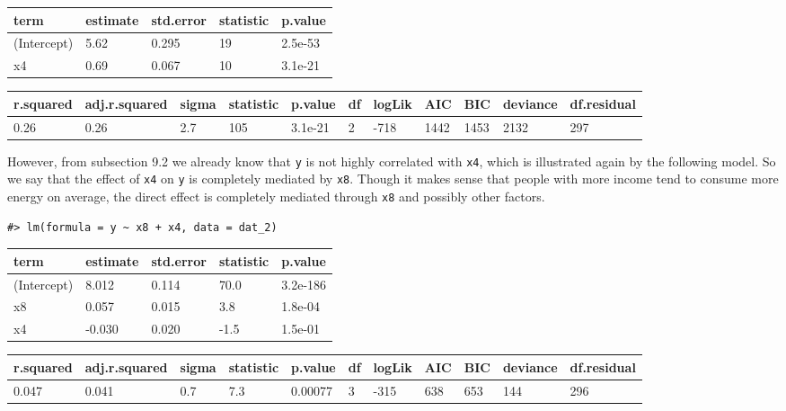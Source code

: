 \documentclass[a4paper]{article}
\begin{document}
\begin{table}[H]
\centering
\begin{tabular}{lllll}
\toprule
term & estimate & std.error & statistic & p.value\\
\midrule
(Intercept) & 5.62 & 0.295 & 19 & 2.5e-53\\
x4 & 0.69 & 0.067 & 10 & 3.1e-21\\
\bottomrule
\end{tabular}
\end{table}

\begin{table}[H]
\centering
\begin{tabular}{lllllllllll}
\toprule
r.squared & adj.r.squared & sigma & statistic & p.value & df & logLik & AIC & BIC & deviance & df.residual\\
\midrule
0.26 & 0.26 & 2.7 & 105 & 3.1e-21 & 2 & -718 & 1442 & 1453 & 2132 & 297\\
\bottomrule
\end{tabular}
\end{table}

However, from subsection 9.2 we already know that \texttt{y} is not
highly correlated with \texttt{x4}, which is illustrated again by the
following model. So we say that the effect of \texttt{x4} on \texttt{y}
is completely mediated by \texttt{x8}. Though it makes sense that people
with more income tend to consume more energy on average, the direct
effect is completely mediated through \texttt{x8} and possibly other
factors.

\begin{verbatim}
#> lm(formula = y ~ x8 + x4, data = dat_2)
\end{verbatim}

\begin{table}[H]
\centering
\begin{tabular}{lllll}
\toprule
term & estimate & std.error & statistic & p.value\\
\midrule
(Intercept) & 8.012 & 0.114 & 70.0 & 3.2e-186\\
x8 & 0.057 & 0.015 & 3.8 & 1.8e-04\\
x4 & -0.030 & 0.020 & -1.5 & 1.5e-01\\
\bottomrule
\end{tabular}
\end{table}

\begin{table}[H]
\centering
\begin{tabular}{lllllllllll}
\toprule
r.squared & adj.r.squared & sigma & statistic & p.value & df & logLik & AIC & BIC & deviance & df.residual\\
\midrule
0.047 & 0.041 & 0.7 & 7.3 & 0.00077 & 3 & -315 & 638 & 653 & 144 & 296\\
\bottomrule
\end{tabular}
\end{table}
\end{document}
